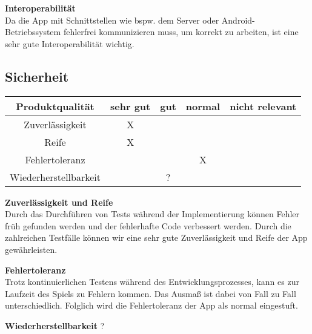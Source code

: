 \documentclass[parskip=full]{scrartcl}
\begin{document}
\textbf{Interoperabilität}\\
Da die App mit Schnittstellen wie bspw. dem Server oder Android-Betriebssystem fehlerfrei kommunizieren muss, um korrekt zu arbeiten, ist eine sehr gute Interoperabilität wichtig.

\subsection{Sicherheit}
\begin{tabular}{| c | c | c | c | c |}
    \hline
    \textbf{Produktqualität} & \textbf{sehr gut} & \textbf{gut} & \textbf{normal} & \textbf{nicht relevant} \\ \hline
    Zuverlässigkeit          & X                 &              &                 &                         \\ \hline
    Reife                    & X                 &              &                 &                         \\ \hline
    Fehlertoleranz           &                   &              & X               &                         \\ \hline
    Wiederherstellbarkeit    &                   & ?            &                 &                         \\ \hline
\end{tabular}

\textbf{Zuverlässigkeit und Reife}\\
Durch das Durchführen von Tests während der Implementierung können Fehler früh gefunden werden und der fehlerhafte Code verbessert werden.
Durch die zahlreichen Testfälle können wir eine sehr gute Zuverlässigkeit und Reife der App gewährleisten.

\textbf{Fehlertoleranz}\\
Trotz kontinuierlichen Testens während des Entwicklungsprozesses, kann es zur Laufzeit des Spiels zu Fehlern kommen.
Das Ausmaß ist dabei von Fall zu Fall unterschiedlich.
Folglich wird die Fehlertoleranz der App als normal eingestuft.

\textbf{Wiederherstellbarkeit}
?
\end{document}
